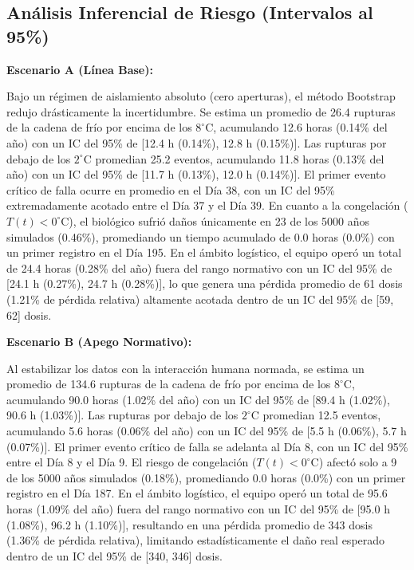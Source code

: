 \documentclass[
  spanish,
  us-letterpaper,
]{scrreprt}
\numberwithin{equation}{section}
\theoremstyle{plain}
\theoremstyle{plain}
\theoremstyle{plain}
\theoremstyle{definition}
\theoremstyle{remark}
\begin{document}
\subsection{Análisis Inferencial de Riesgo (Intervalos al
95\%)}\label{anuxe1lisis-inferencial-de-riesgo-intervalos-al-95}

\textbf{Escenario A (Línea Base):}

Bajo un régimen de aislamiento absoluto (cero aperturas), el método
Bootstrap redujo drásticamente la incertidumbre. Se estima un promedio
de 26.4 rupturas de la cadena de frío por encima de los
\(8^\circ\text{C}\), acumulando 12.6 horas (0.14\% del año) con un IC
del 95\% de {[}12.4 h (0.14\%), 12.8 h (0.15\%){]}. Las rupturas por
debajo de los \(2^\circ\text{C}\) promedian 25.2 eventos, acumulando
11.8 horas (0.13\% del año) con un IC del 95\% de {[}11.7 h (0.13\%),
12.0 h (0.14\%){]}. El primer evento crítico de falla ocurre en promedio
en el Día 38, con un IC del 95\% extremadamente acotado entre el Día 37
y el Día 39. En cuanto a la congelación (\(T(t)<0^\circ\text{C}\)), el
biológico sufrió daños únicamente en 23 de los 5000 años simulados
(0.46\%), promediando un tiempo acumulado de 0.0 horas (0.0\%) con un
primer registro en el Día 195. En el ámbito logístico, el equipo operó
un total de 24.4 horas (0.28\% del año) fuera del rango normativo con un
IC del 95\% de {[}24.1 h (0.27\%), 24.7 h (0.28\%){]}, lo que genera una
pérdida promedio de 61 dosis (1.21\% de pérdida relativa) altamente
acotada dentro de un IC del 95\% de {[}59, 62{]} dosis.

\textbf{Escenario B (Apego Normativo):}

Al estabilizar los datos con la interacción humana normada, se estima un
promedio de 134.6 rupturas de la cadena de frío por encima de los
\(8^\circ\text{C}\), acumulando 90.0 horas (1.02\% del año) con un IC
del 95\% de {[}89.4 h (1.02\%), 90.6 h (1.03\%){]}. Las rupturas por
debajo de los \(2^\circ\text{C}\) promedian 12.5 eventos, acumulando 5.6
horas (0.06\% del año) con un IC del 95\% de {[}5.5 h (0.06\%), 5.7 h
(0.07\%){]}. El primer evento crítico de falla se adelanta al Día 8, con
un IC del 95\% entre el Día 8 y el Día 9. El riesgo de congelación
(\(T(t)<0^\circ\text{C}\)) afectó solo a 9 de los 5000 años simulados
(0.18\%), promediando 0.0 horas (0.0\%) con un primer registro en el Día
187. En el ámbito logístico, el equipo operó un total de 95.6 horas
(1.09\% del año) fuera del rango normativo con un IC del 95\% de {[}95.0
h (1.08\%), 96.2 h (1.10\%){]}, resultando en una pérdida promedio de
343 dosis (1.36\% de pérdida relativa), limitando estadísticamente el
daño real esperado dentro de un IC del 95\% de {[}340, 346{]} dosis.
\end{document}

